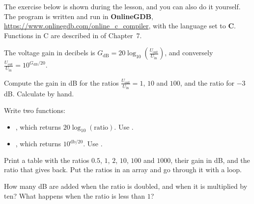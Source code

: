 The exercise below is shown during the lesson, and you can also do it yourself. The program is
written and run in \textbf{OnlineGDB}, \url{https://www.onlinegdb.com/online_c_compiler}, with the
language set to \textbf{C}. Functions in C are described in  of Chapter~7.

The voltage gain in decibels is
$G_{\text{dB}} = 20\log_{10}\left(\frac{U_{\text{out}}}{U_{\text{in}}}\right)$, and conversely
$\frac{U_{\text{out}}}{U_{\text{in}}} = 10^{G_{\text{dB}}/20}$.
\begin{parts}
  \item Compute the gain in dB for the ratios $\frac{U_{\text{out}}}{U_{\text{in}}} = 1$, $10$ and
    $100$, and the ratio for $-3$ dB. Calculate by hand.
  \item Write two functions:
    \begin{itemize}
      \item {}, which returns $20\log_{10}(\text{ratio})$. Use
        .
      \item {}, which returns $10^{\text{db}/20}$. Use
        .
    \end{itemize}
    Print a table with the ratios $0.5$, $1$, $2$, $10$, $100$ and $1000$, their gain in dB, and
    the ratio that  gives back. Put the ratios in an array and go through
    it with a loop.
  \item How many dB are added when the ratio is doubled, and when it is multiplied by ten? What
    happens when the ratio is less than $1$?
\end{parts}
